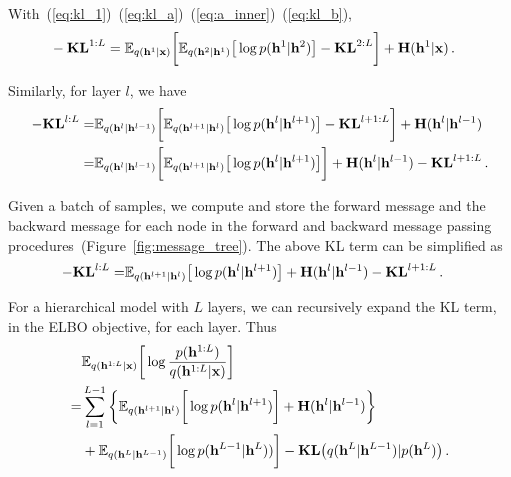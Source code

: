 \documentclass[twoside]{article}
\begin{document}
With~(\ref{eq:kl_1})~(\ref{eq:kl_a})~(\ref{eq:a_inner})~(\ref{eq:kl_b}), 
\begin{align*}
&-\textbf{\text{KL}}^{1:L} =    \mathbb{E}_{q(\mathbf{h}^{1}|\mathbf{x})} \bigg[  \mathbb{E}_{q(\mathbf{h}^{2}|\mathbf{h}^1)} \big[ \log p( \mathbf{h}^{1}|  \mathbf{h}^{2})    \big]  - \textbf{\text{KL}}^{2:L}  \bigg] +  \textbf{\text{H}}(\mathbf{h}^{1}|\mathbf{x}) \, .
\end{align*}

Similarly, for layer $l$, we  have 
\begin{align*} %
-\textbf{\text{KL}}^{l:L} 
=  & \mathbb{E}_{q(\mathbf{h}^{l}|\mathbf{h}^{l-1})} \bigg[  \mathbb{E}_{q(\mathbf{h}^{l+1}|\mathbf{h}^l)} \big[ \log p( \mathbf{h}^{l}|  \mathbf{h}^{l+1})    \big]  - \textbf{\text{KL}}^{l+1:L}  \bigg]   +  \textbf{\text{H}}(\mathbf{h}^{l}|\mathbf{h}^{l-1}) \\ \notag
=&    \mathbb{E}_{q(\mathbf{h}^{l}|\mathbf{h}^{l-1})} \bigg[  \mathbb{E}_{q(\mathbf{h}^{l+1}|\mathbf{h}^l)} \big[ \log p( \mathbf{h}^{l}|  \mathbf{h}^{l+1})    \big]   \bigg] +  \textbf{\text{H}}(\mathbf{h}^{l}|\mathbf{h}^{l-1})  - \textbf{\text{KL}}^{l+1:L} \, .
\end{align*}

Given a batch of samples, we compute  and store the forward message and the backward message for each node in the forward and backward message passing procedures~(Figure~\ref{fig:message_tree}).  
The above KL term can be simplified as
\begin{align} \label{eq:KL_tree}
-\textbf{\text{KL}}^{l:L} 
=&     \mathbb{E}_{q(\mathbf{h}^{l+1}|\mathbf{h}^l)} \big[ \log p( \mathbf{h}^{l}|  \mathbf{h}^{l+1})    \big]  +  \textbf{\text{H}}(\mathbf{h}^{l}|\mathbf{h}^{l-1})   - \textbf{\text{KL}}^{l+1:L} \, .
\end{align}


For a hierarchical model with $L$ layers, we can recursively expand the KL term, in the ELBO objective, for each layer.  Thus 
\begin{align} \label{eq:KL_all}
& \mathbb{E}_{q(\mathbf{h}^{1:L} | \mathbf{x})} \bigg[ \log  \frac{p( \mathbf{h}^{1:L})}{q(\mathbf{h}^{1:L}|\mathbf{x})}  \bigg] \\ \notag
=& \sum_{l=1}^{L-1} \bigg\{   \mathbb{E}_{q(\mathbf{h}^{l+1}|\mathbf{h}^l)} \bigg[ \log p( \mathbf{h}^{l}|  \mathbf{h}^{l+1})   \bigg]  +    \textbf{\text{H}}(\mathbf{h}^l | \mathbf{h}^{l-1} )  \bigg\} \\ \notag
&+  \mathbb{E}_{q(\mathbf{h}^L|\mathbf{h}^{L-1})} \bigg[ \log p( \mathbf{h}^{L-1}|  \mathbf{h}^L) )  \bigg]    -   \textbf{\text{KL}}\big(q(\mathbf{h}^L | \mathbf{h}^{L-1} )   | p(\mathbf{h}^L)  \big) \, .
 \end{align}
\end{document}

